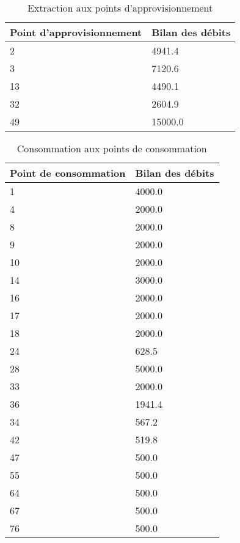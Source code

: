     \begin{table}[h]
      \centering
      \begin{tabular}{|l|l|} \hline
          \textbf{Point d'approvisionnement} & \textbf{Bilan des débits} \\ \hline
          2 & 4941.4 \\ \hline
          3 & 7120.6 \\ \hline
          13 & 4490.1 \\ \hline
          32 & 2604.9 \\ \hline
          49 & 15000.0 \\ \hline
      \end{tabular}
      \caption{Extraction aux points d'approvisionnement}
      \label{extapr}
    \end{table}
    \begin{table}[h]
      \centering
      \begin{tabular}{|l|l|} \hline
          \textbf{Point de consommation} & \textbf{Bilan des débits} \\ \hline
          1 & 4000.0 \\ \hline
          4 & 2000.0 \\ \hline
          8 & 2000.0 \\ \hline
          9 & 2000.0 \\ \hline
          10 & 2000.0 \\ \hline
          14 & 3000.0 \\ \hline
          16 & 2000.0 \\ \hline
          17 & 2000.0 \\ \hline
          18 & 2000.0 \\ \hline
          24 & 628.5 \\ \hline
          28 & 5000.0 \\ \hline
          33 & 2000.0 \\ \hline
          36 & 1941.4 \\ \hline
          34 & 567.2 \\ \hline
          42 & 519.8 \\ \hline
          47 & 500.0 \\ \hline
          55 & 500.0 \\ \hline
          64 & 500.0 \\ \hline
          67 & 500.0 \\ \hline
          76 & 500.0 \\ \hline
        \end{tabular}
      \caption{Consommation aux points de consommation}
      \label{extapr}
    \end{table}


